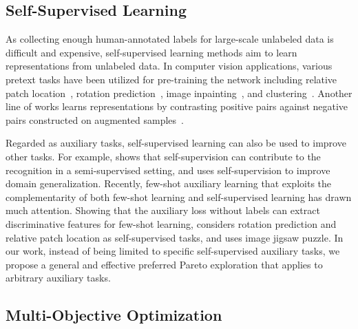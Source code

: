 \documentclass[final]{cvpr}
\begin{document}
\subsection{Self-Supervised Learning}

As collecting enough human-annotated labels for large-scale unlabeled data is difficult and expensive, self-supervised learning methods aim to learn representations from unlabeled data. In computer vision applications, various pretext tasks have been utilized for pre-training the network including relative patch location~\cite{doersch2015unsupervised}, rotation prediction~\cite{gidaris2018unsupervised}, image inpainting~\cite{pathak2016context}, and clustering~\cite{caron2019unsupervised}. Another line of works learns representations by contrasting positive pairs against negative pairs constructed on augmented samples~\cite{bojanowski2017unsupervised,dosovitskiy2014discriminative,he2020momentum,xiao2019dynamic,xiao2018neural,yan2020pointasnl}.  

Regarded as auxiliary tasks, self-supervised learning can also be used to improve other tasks. For example, \cite{zhai2019s4l} shows that self-supervision can contribute to the recognition in a semi-supervised setting, and \cite{carlucci2019domain} uses self-supervision to improve domain generalization. Recently, few-shot auxiliary learning that exploits the complementarity of both few-shot learning and self-supervised learning has drawn much attention. Showing that the auxiliary loss without labels can extract discriminative features for few-shot learning, \cite{GidarisBKPC19} considers rotation prediction and relative patch location as self-supervised tasks, and \cite{SuMH20} uses image jigsaw puzzle. In our work, instead of being limited to specific self-supervised auxiliary tasks, we propose a general and effective preferred Pareto exploration that applies to arbitrary auxiliary tasks.

\subsection{Multi-Objective Optimization}
\end{document}
